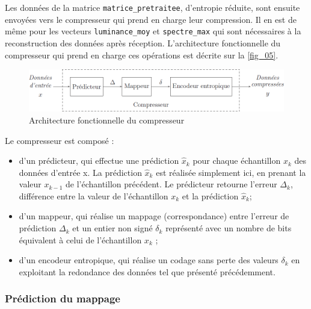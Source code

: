 \documentclass[10pt,fleqn]{article} %
\begin{document}
Les données de la matrice \texttt{matrice\_pretraitee}, d’entropie réduite, sont ensuite envoyées
vers le compresseur qui prend en charge leur compression. Il en est de même pour les vecteurs 
\texttt{luminance\_moy} et \texttt{spectre\_max} qui sont nécessaires à la reconstruction des données après
réception. L’architecture fonctionnelle du compresseur qui prend en charge ces opérations est
décrite sur la \autoref{fig_05}.

\begin{figure}[H]
\centering
\includegraphics[width=.7\linewidth]{images/fig_05}
\caption{Architecture fonctionnelle du compresseur \label{fig_05}}
\end{figure}


Le compresseur est composé :
\begin{itemize}
\item d’un prédicteur, qui effectue une prédiction $\hat{x}_k$ pour chaque échantillon ${x}_k$ des données
d’entrée x. La prédiction $\hat{x}_k$ est réalisée simplement ici, en prenant la valeur ${x}_{k-1}$ de
l’échantillon précédent. Le prédicteur retourne l’erreur $\Delta_k$, différence entre la valeur de
l’échantillon ${x}_k$ et la prédiction $\hat{x}_k$;
\item d’un mappeur, qui réalise un mappage (correspondance) entre l’erreur de prédiction $\Delta_k$ et
un entier non signé $\delta_k$ représenté avec un nombre de bits équivalent à celui de l’échantillon
$x_k$ ;
\item d’un encodeur entropique, qui réalise un codage sans perte des valeurs $\delta_k$ en exploitant la
redondance des données tel que présenté précédemment.
\end{itemize}
\fi

\subsubsection{Prédiction du mappage}

\ifprof
\else
\end{document}
